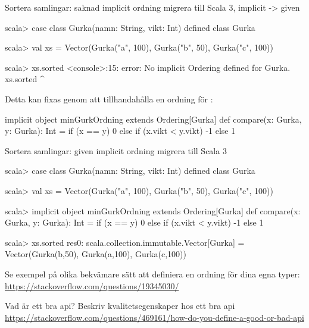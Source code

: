 \begin{Slide}{Sortera samlingar: saknad implicit ordning}
\TODO migrera till Scala 3, implicit -> given
\begin{REPL}
scala> case class Gurka(namn: String, vikt: Int)
defined class Gurka

scala> val xs = Vector(Gurka("a", 100), Gurka("b", 50), Gurka("c", 100))

scala> xs.sorted
<console>:15: error: No implicit Ordering defined for Gurka.
       xs.sorted
          ^
\end{REPL}
\pause
Detta kan fixas genom att tillhandahålla en  ordning för :
\begin{Code}
implicit object minGurkOrdning extends Ordering[Gurka] {
  def compare(x: Gurka, y: Gurka): Int =
    if (x == y) 0
    else if (x.vikt < y.vikt) -1
    else 1
}
\end{Code}
\end{Slide}


\begin{Slide}{Sortera samlingar: given implicit ordning}
\TODO migrera till Scala 3

\begin{REPL}
scala> case class Gurka(namn: String, vikt: Int)
defined class Gurka

scala> val xs = Vector(Gurka("a", 100), Gurka("b", 50), Gurka("c", 100))

scala> implicit object minGurkOrdning extends Ordering[Gurka] {
         def compare(x: Gurka, y: Gurka): Int =
           if (x == y) 0
           else if (x.vikt < y.vikt) -1
           else 1
       }

scala> xs.sorted
res0: scala.collection.immutable.Vector[Gurka] =
        Vector(Gurka(b,50), Gurka(a,100), Gurka(c,100))
\end{REPL}
{\SlideFontTiny Se exempel på olika bekvämare sätt att definiera en ordning för dina egna typer: \\
\url{https://stackoverflow.com/questions/19345030/}}
\end{Slide}


\begin{Slide}{Vad är ett bra api?}
\TODO Beskriv kvalitetsegenskaper hos ett bra api\\
\href{https://stackoverflow.com/questions/469161/how-do-you-define-a-good-or-bad-api}{https://stackoverflow.com/questions/469161/how-do-you-define-a-good-or-bad-api}  
\end{Slide}




